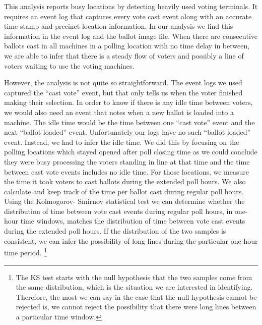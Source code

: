 This analysis reports busy locations by detecting heavily used voting terminals. It requires an event log that captures every vote cast event along with an accurate time stamp and precinct location information. In our analysis we find this information in the event log and the ballot image file. When there are consecutive ballots cast in all machines in a polling location with no time delay in between, we are able to infer that there is a steady flow of voters and possibly a line of voters waiting to use the voting machines. 

However, the analysis is not quite so straightforward. The event logs
we used captured the \textquotedblleft cast vote'' event, but that
only tells us when the voter finished making their selection. In order
to know if there is any idle time between voters, we would also need
an event that notes when a new ballot is loaded into a machine. The
idle time would be the time between one \textquotedblleft cast vote''
event and the next \textquotedblleft ballot loaded''
event. Unfortunately our logs have no such \textquotedblleft ballot
loaded'' event. Instead, we had to infer the idle time. We did this by
focusing on the polling locations which stayed opened after poll
closing time as we could conclude they were busy processing the voters
standing in line at that time and the time between cast vote events
includes no idle time. For those locations, we measure the time it
took voters to cast ballots during the extended poll hours. We also
calculate and keep track of the time per ballot cast during regular
poll hours. Using the Kolmogorov- Smirnov statistical test we can
determine whether the distribution of time between vote cast events
during regular poll hours, in one-hour time windows, matches the
distribution of time between vote cast events during the extended poll
hours. If the distribution of the two samples is consistent, we can
infer the possibility of long lines during the particular one-hour
time period. \footnote{The KS test starts with the null hypothesis
  that the two samples come from the same distribution, which is the
  situation we are interested in identifying. Therefore, the most we
  can say in the case that the null hypothesis cannot be rejected is, we
  cannot reject the possibility that there were long lines between a
  particular time window.} 
